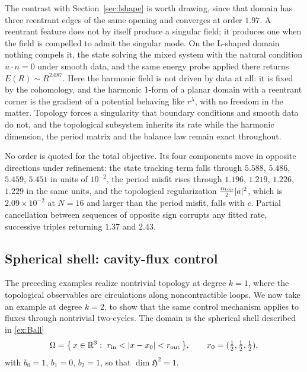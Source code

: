 \documentclass{article}
\newcommand{\R} {\mathbb R}
\newcommand{\HH}{\mathfrak H}
\newcommand{\Piop}{\boldsymbol\Pi}
\newcommand{\ip}[2]{\langle #1,#2\rangle}
\newcommand{\norm}[1]{\lVert #1\rVert}
\begin{document}
The contrast with Section~\ref{sec:lshape} is worth drawing, since that domain
has three reentrant edges of the same opening and converges at order $1.97$. A
reentrant feature does not by itself produce a singular field; it produces one
when the field is compelled to admit the singular mode. On the L-shaped domain
nothing compels it, the state solving the mixed system with the natural
condition $u\cdot n=0$ under smooth data, and the same energy probe applied
there returns $E(R)\sim R^{2.087}$. Here the harmonic field is not driven by
data at all: it is fixed by the cohomology, and the harmonic $1$-form of a
planar domain with a reentrant corner is the gradient of a potential behaving
like $r^{\lambda}$, with no freedom in the matter. Topology forces a
singularity that boundary conditions and smooth data do not, and the
topological subsystem inherits its rate while the harmonic dimension, the
period matrix and the balance law remain exact throughout.

No order is quoted for the total objective. Its four components move in
opposite directions under refinement: the state tracking term falls through
$5.588$, $5.486$, $5.459$, $5.451$ in units of $10^{-2}$, the period misfit
rises through $1.196$, $1.219$, $1.226$, $1.229$ in the same units, and the
topological regularization $\tfrac{\alpha_{\rm top}}{2}|a|^{2}$, which is
$2.09\times10^{-2}$ at $N=16$ and larger than the period misfit, falls with
$c$. Partial cancellation between sequences of opposite sign corrupts any
fitted rate, successive triples returning $1.37$ and $2.43$.

\subsection{Spherical shell: cavity-flux control}
\label{sec:shell-numerics}






 
The preceding examples realize nontrivial topology at degree $k=1$,
where the topological observables are circulations along
noncontractible loops. We now take an example at degree $k=2$, to show
that the same control mechanism applies to fluxes through nontrivial
two-cycles. The domain is the spherical shell  described in \ref{ex:Ball}
\[
  \Omega=\bigl\{\,x\in\R^3:\ r_{\rm in}<|x-x_0|<r_{\rm out}\,\bigr\},
  \qquad x_0=(\tfrac12,\tfrac12,\tfrac12),
\]
with $b_0=1$, $b_1=0$, $b_2=1$, so that $\dim\HH^2=1$.
 
\end{document}
